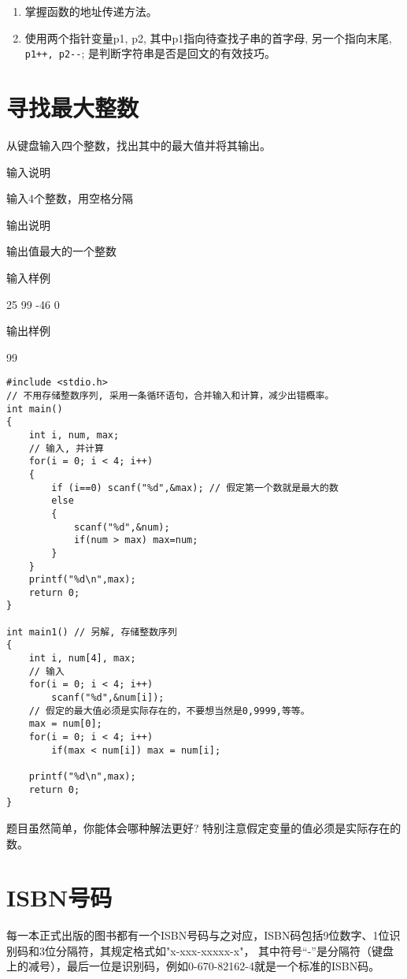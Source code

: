 \begin{note}[要点]
	\begin{enumerate}
		\item 掌握函数的地址传递方法。
		\item 使用两个指针变量p1, p2, 其中p1指向待查找子串的首字母, 另一个指向末尾, \lstinline|p1++, p2--|; 是判断字符串是否是回文的有效技巧。
	\end{enumerate}
\end{note}

\section{寻找最大整数}
从键盘输入四个整数，找出其中的最大值并将其输出。

输入说明
	
输入4个整数，用空格分隔

输出说明
	
输出值最大的一个整数

输入样例
	
25 99 -46 0

输出样例
	
99

\begin{lstlisting}
#include <stdio.h>
// 不用存储整数序列, 采用一条循环语句，合并输入和计算，减少出错概率。 
int main() 
{
	int i, num, max;
	// 输入, 并计算 
	for(i = 0; i < 4; i++) 
	{ 
		if (i==0) scanf("%d",&max); // 假定第一个数就是最大的数 
		else
		{
			scanf("%d",&num);
			if(num > max) max=num; 
		} 
	} 
	printf("%d\n",max);
	return 0;
} 

int main1() // 另解, 存储整数序列
{
	int i, num[4], max;
	// 输入 
	for(i = 0; i < 4; i++) 
		scanf("%d",&num[i]);
	// 假定的最大值必须是实际存在的，不要想当然是0,9999,等等。
	max = num[0]; 
	for(i = 0; i < 4; i++)  
		if(max < num[i]) max = num[i];
	
	printf("%d\n",max);
	return 0;
} 
\end{lstlisting}

\begin{note}[要点]
	题目虽然简单，你能体会哪种解法更好? 特别注意假定变量的值必须是实际存在的数。
\end{note}

\section{ISBN号码}
每一本正式出版的图书都有一个ISBN号码与之对应，ISBN码包括9位数字、1位识别码和3位分隔符，其规定格式如"x-xxx-xxxxx-x"，
其中符号“-”是分隔符（键盘上的减号），最后一位是识别码，例如0-670-82162-4就是一个标准的ISBN码。

